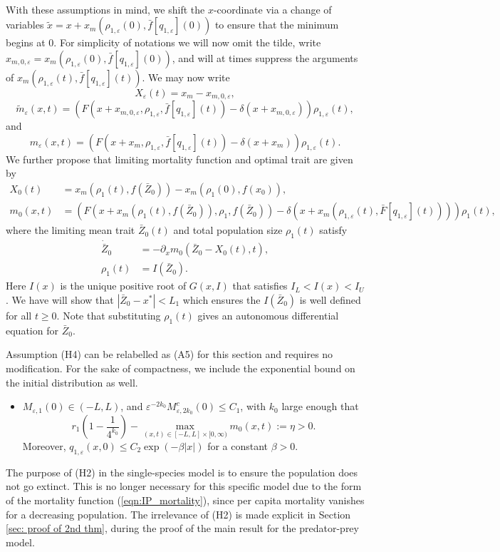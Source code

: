 \documentclass[]{article}
\theoremstyle{remark}
\begin{document}
\ \\
With these assumptions in mind, we shift the $x$-coordinate via a change of variables $\tilde{x}=x+x_{m}(\rho_{1,\varepsilon}(0),\bar{f}[q_{1,\varepsilon}](0))$ to ensure that the minimum begins at $0$. For simplicity of notations we will now omit the tilde, write $x_{m,0,\varepsilon}=x_m(\rho_{1,\varepsilon}(0),\bar{f}[q_{1,\varepsilon}](0))$, and will at times suppress the arguments of $x_m(\rho_{1,\varepsilon}(t),\bar{f}[q_{1,\varepsilon}](t))$.
We may now write \[X_\varepsilon(t)=x_m-x_{m,0,\varepsilon},\] 
\[\tilde{m}_\varepsilon(x,t)=\left(F(x+x_{m,0,\varepsilon},\rho_{1,\varepsilon},\bar{f}[q_{1,\varepsilon}](t))-\delta(x+x_{m,0,\varepsilon})\right)\rho_{1,\varepsilon}(t),\]
 and 
\begin{equation}\label{eqn:IP_mortality}
{m}_\varepsilon(x,t)=\left(F(x+x_{m},\rho_{1,\varepsilon},\bar{f}[q_{1,\varepsilon}](t))-\delta(x+x_{m})\right)\rho_{1,\varepsilon}(t).
    \end{equation}
We further propose that limiting mortality function and optimal trait are given by
\begin{align*}
X_0(t)&=x_m(\rho_{1}(t),f(\bar{Z}_0))-x_m(\rho_{1}(0),f(x_0)),\\
m_0(x,t)&=\left(F(x+x_m(\rho_{1}(t),f(\bar{Z}_0)),\rho_1,f(\bar{Z}_0))-\delta(x+x_m(\rho_{1,\varepsilon}(t),\bar{F}[q_{1,\varepsilon}](t)))\right)\rho_{1}(t),
\end{align*}
where the limiting mean trait $\bar{Z}_0(t)$ and total population size $\rho_1(t)$ satisfy
\begin{align*}
   \dot{\bar{Z}}_0&=-\partial_{x}m_0(\bar{Z}_0-X_0(t),t),\\
   \rho_1(t)&=I(\bar{Z}_0).
\end{align*}
Here $I(x)$ is the unique positive root of $G(x,I)$ that satisfies $I_L<I(x)<I_U$. We have will show that $|\bar{Z}_0-x^{*}|<L_1$ which ensures the $I(\bar{Z}_0)$ is well defined for all $t\geq{0}$. Note that substituting $\rho_1(t)$ gives an autonomous differential equation for $\bar{Z}_0$.

Assumption (H4) can be relabelled as (A5) for this section and requires no modification. For the sake of compactness, we include the exponential bound on the initial distribution as well.
\ \\
\begin{itemize}
\item[(A5)] $M_{\varepsilon,1}(0)\in(-L,L)$, and $\varepsilon^{-2k_0}M^{c}_{\varepsilon,2k_0}(0)\leq{}C_1$, with $k_0$ large enough that \[r_1\left(1-\frac{1}{4^{k_0}}\right)-\max_{(x,t)\in[-L,L]\times[0,\infty)}m_0(x,t):=\eta>0.\]
Moreover, $q_{1,\varepsilon}(x,0)\leq{}C_2\exp(-\beta|x|)$ for a constant $\beta>0$.
\end{itemize}
The purpose of (H2) in the single-species model is to ensure the population does not go extinct. This is no longer necessary for this specific model due to the form of the mortality function (\ref{eqn:IP_mortality}), since per capita mortality vanishes for a decreasing population. The irrelevance of (H2) is made explicit in Section \ref{sec: proof of 2nd thm}, during the proof of the main result for the predator-prey model. 
\end{document}
